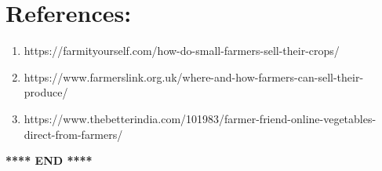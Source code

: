 \documentclass[12pt]{article}
\begin{document}
\clearpage
\normalsize
\section{References:}
\begin{enumerate}
    \item https://farmityourself.com/how-do-small-farmers-sell-their-crops/
    \item https://www.farmerslink.org.uk/where-and-how-farmers-can-sell-their-produce/
    \item https://www.thebetterindia.com/101983/farmer-friend-online-vegetables-direct-from-farmers/
\end{enumerate}


\begin{center}
    \textbf{**** END ****}
\end{center}
\end{document}
